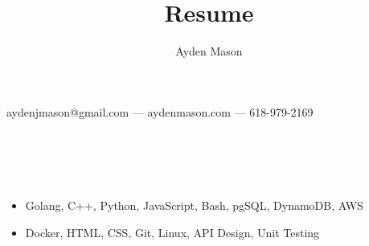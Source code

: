 \documentclass{article}
\makeatletter
\renewcommand{\maketitle}{

\begin{center}
{\huge\bfseries
\theauthor}


aydenjmason@gmail.com --- aydenmason.com --- 618-979-2169
\end{center}
}
\makeatother
\begin{document}
\bgroup\obeylines
\title{Resume}
\author{Ayden Mason}

\maketitle
\color{blue}
\section{\\}
\color{black}
\begin{itemize}
\item Golang, C++, Python, JavaScript, Bash, pgSQL, DynamoDB, AWS
\item Docker, HTML, CSS, Git, Linux, API Design, Unit Testing
\end{itemize}
\color{blue}
\end{document}
